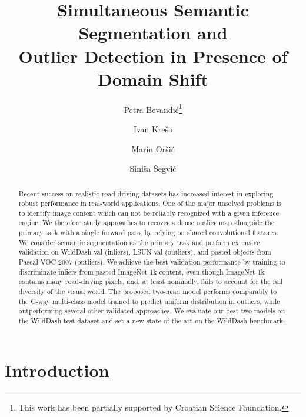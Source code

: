 \documentclass[runningheads]{llncs}
\begin{document}
	\pagestyle{headings}
	\mainmatter

\title{Simultaneous Semantic Segmentation and
\\
    Outlier Detection
    in Presence of Domain Shift} 
\author{
Petra Bevandi{\' c}\thanks{This work has been partially supported by Croatian Science Foundation.} \and
Ivan Kre{\v s}o \and
Marin Or{\v s}i{\' c} \and
Sini{\v s}a {\v S}egvi{\' c}
}



	\maketitle

\begin{abstract}
    Recent success on realistic
    road driving datasets
has increased interest in exploring
    robust performance 
    in real-world applications.
One of the major unsolved problems
    is to identify image content
    which can not be reliably recognized
    with a given inference engine.
We therefore study approaches
    to recover a dense outlier map
alongside the primary task
    with a single forward pass,
    by relying on shared convolutional features.
We consider semantic segmentation
    as the primary task and
    perform extensive validation
    on WildDash val (inliers),
    LSUN val (outliers),
    and pasted objects from
    Pascal VOC 2007 (outliers).
We achieve the best validation performance
    by training to discriminate inliers
    from pasted ImageNet-1k content,
    even though ImageNet-1k contains 
    many road-driving pixels,
    and, at least nominally, fails to account 
    for the full diversity of the visual world.
    The proposed two-head model performs
    comparably to the C-way multi-class model
    trained to predict 
    uniform distribution in outliers,
    while outperforming several
    other validated approaches.
We evaluate our best two models 
    on the WildDash test dataset
    and set a new state of the art 
    on the WildDash benchmark.
\end{abstract}
\section{Introduction}
\end{document}
